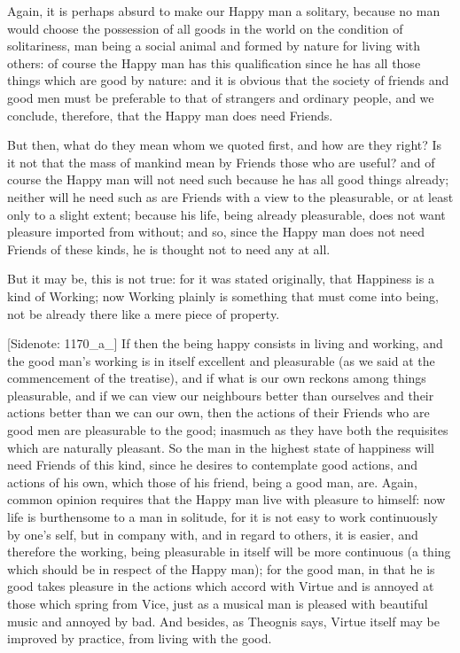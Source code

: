 Again, it is perhaps absurd to make our Happy man a solitary, because
no man would choose the possession of all goods in the world on the
condition of solitariness, man being a social animal and formed by
nature for living with others: of course the Happy man has this
qualification since he has all those things which are good by nature:
and it is obvious that the society of friends and good men must be
preferable to that of strangers and ordinary people, and we conclude,
therefore, that the Happy man does need Friends.

But then, what do they mean whom we quoted first, and how are they
right? Is it not that the mass of mankind mean by Friends those who are
useful? and of course the Happy man will not need such because he has
all good things already; neither will he need such as are Friends with
a view to the pleasurable, or at least only to a slight extent; because
his life, being already pleasurable, does not want pleasure imported
from without; and so, since the Happy man does not need Friends of these
kinds, he is thought not to need any at all.

But it may be, this is not true: for it was stated originally, that
Happiness is a kind of Working; now Working plainly is something
that must come into being, not be already there like a mere piece of
property.

[Sidenote: 1170_a_] If then the being happy consists in living and
working, and the good man's working is in itself excellent and
pleasurable (as we said at the commencement of the treatise), and if
what is our own reckons among things pleasurable, and if we can view our
neighbours better than ourselves and their actions better than we
can our own, then the actions of their Friends who are good men are
pleasurable to the good; inasmuch as they have both the requisites which
are naturally pleasant. So the man in the highest state of happiness
will need Friends of this kind, since he desires to contemplate good
actions, and actions of his own, which those of his friend, being a good
man, are. Again, common opinion requires that the Happy man live with
pleasure to himself: now life is burthensome to a man in solitude, for
it is not easy to work continuously by one's self, but in company with,
and in regard to others, it is easier, and therefore the working, being
pleasurable in itself will be more continuous (a thing which should be
in respect of the Happy man); for the good man, in that he is good takes
pleasure in the actions which accord with Virtue and is annoyed at those
which spring from Vice, just as a musical man is pleased with beautiful
music and annoyed by bad. And besides, as Theognis says, Virtue itself
may be improved by practice, from living with the good.

